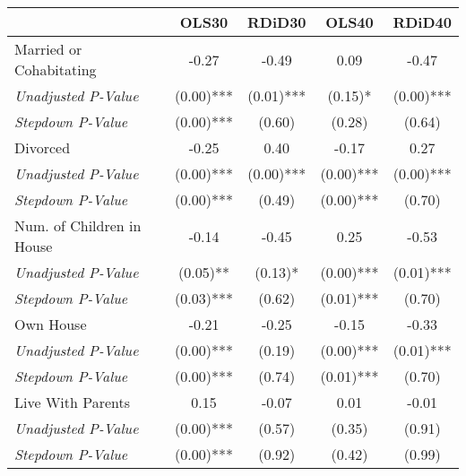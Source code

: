 \begin{tabular}{l c c c c}
\toprule
 & OLS30 & RDiD30 & OLS40 & RDiD40 \\
\midrule
Married or Cohabitating & -0.27 & -0.49 & 0.09 & -0.47 \\
\quad \textit{Unadjusted P-Value} & (0.00)*** & (0.01)*** & (0.15)* & (0.00)*** \\
\quad \textit{Stepdown P-Value} & (0.00)*** & (0.60) & (0.28) & (0.64) \\
Divorced & -0.25 & 0.40 & -0.17 & 0.27 \\
\quad \textit{Unadjusted P-Value} & (0.00)*** & (0.00)*** & (0.00)*** & (0.00)*** \\
\quad \textit{Stepdown P-Value} & (0.00)*** & (0.49) & (0.00)*** & (0.70) \\
Num. of Children in House & -0.14 & -0.45 & 0.25 & -0.53 \\
\quad \textit{Unadjusted P-Value} & (0.05)** & (0.13)* & (0.00)*** & (0.01)*** \\
\quad \textit{Stepdown P-Value} & (0.03)*** & (0.62) & (0.01)*** & (0.70) \\
Own House & -0.21 & -0.25 & -0.15 & -0.33 \\
\quad \textit{Unadjusted P-Value} & (0.00)*** & (0.19) & (0.00)*** & (0.01)*** \\
\quad \textit{Stepdown P-Value} & (0.00)*** & (0.74) & (0.01)*** & (0.70) \\
Live With Parents & 0.15 & -0.07 & 0.01 & -0.01 \\
\quad \textit{Unadjusted P-Value} & (0.00)*** & (0.57) & (0.35) & (0.91) \\
\quad \textit{Stepdown P-Value} & (0.00)*** & (0.92) & (0.42) & (0.99) \\
\bottomrule
\end{tabular}
